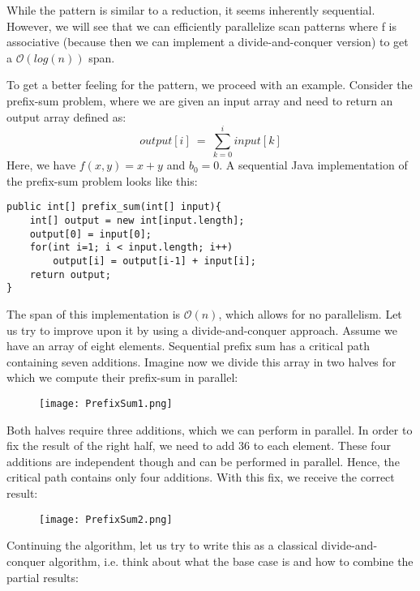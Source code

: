 \documentclass[main.tex]{subfiles}
\begin{document}
\noindent While the pattern is similar to a reduction, it seems inherently sequential. However, we will see that we can efficiently parallelize scan patterns where f is associative (because then we can implement a divide-and-conquer version) to get a \(\mathcal{O}(log(n))\) span.

To get a better feeling for the pattern, we proceed with an example. Consider the prefix-sum problem, where we are given an input array and need to return an output array defined as:
$$output[i]\ =\ \sum_{k=0}^{i}input[k]$$
Here, we have \(f(x,y)=x+y\) and \(b_{0}= 0\). A sequential Java implementation of the prefix-sum problem looks like this:

\begin{verbatim}
public int[] prefix_sum(int[] input){
    int[] output = new int[input.length];
    output[0] = input[0];
    for(int i=1; i < input.length; i++)
        output[i] = output[i-1] + input[i];
    return output;
}
\end{verbatim}

\noindent The span of this implementation is \(\mathcal{O}(n)\), which allows for no parallelism. Let us try to improve upon it by using a divide-and-conquer approach. Assume we have an array of eight elements. Sequential prefix sum has a critical path containing seven additions. Imagine now we divide this array in two halves for which we compute their prefix-sum in parallel:

\begin{figure}[H]
    \centering
    \texttt{[image: PrefixSum1.png]}
\end{figure}

\noindent Both halves require three additions, which we can perform in parallel. In order to fix the result of the right half, we need to add 36 to each element. These four additions are independent though and can be performed in parallel. Hence, the critical path contains only four additions. With this fix, we receive the correct result:

\begin{figure}[H]
    \centering
    \texttt{[image: PrefixSum2.png]}
\end{figure}

\noindent Continuing the algorithm, let us try to write this as a classical divide-and-conquer algorithm, i.e. think about what the base case is and how to combine the partial results:
\end{document}
